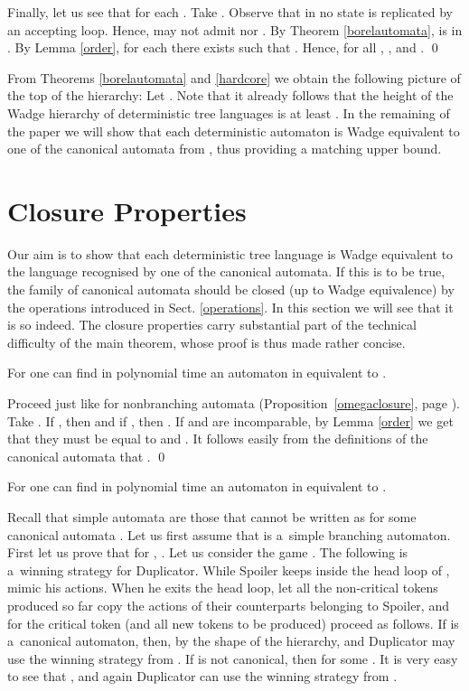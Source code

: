 \documentclass{LMCS}
\begin{document}
Finally, let us see that  for each . Take . Observe that in  no state is replicated by an accepting loop. Hence,  may not admit  nor . By Theorem \ref{borelautomata},   is in . By Lemma \ref{order}, for each  there exists  such that . Hence, for all , , and . \qed

\vspace{5pt}

From Theorems \ref{borelautomata} and \ref{hardcore} we obtain the
following picture of the top of the hierarchy:  Let . Note that it already follows
that the height of the Wadge hierarchy of deterministic tree languages
is at least
. In the remaining of the paper we will
show that each deterministic automaton is Wadge equivalent to one of
the canonical automata from , thus providing a matching
upper bound.

\section{Closure Properties} \label{closureproperties}

Our aim is to show that each deterministic tree language is Wadge equivalent to the language recognised by one of the canonical automata. If this is to be true, the family of canonical automata should be closed (up to Wadge equivalence) by the operations introduced in Sect. \ref{operations}. In this section we will see that it is so indeed. The closure properties carry substantial part of the technical difficulty of the main theorem, whose proof is thus made rather concise. 

\begin{prop}\label{lor_closure}
For  one can find in polynomial time an automaton in  equivalent to .
\end{prop}

\proof Proceed just like for nonbranching automata (Proposition~\ref{omegaclosure}, page \pageref{omegaclosure}). Take . If , then  and if  , then . If  and  are incomparable, by Lemma \ref{order} we get that they must be equal to  and . It follows easily from the definitions of the canonical automata that . \qed

\begin{prop}\label{oplus_closure}
For  one can find in polynomial time an automaton in  equivalent to .
\end{prop}

\proof Recall that simple automata are those that cannot be written as  for some canonical automata . Let us first assume that  is a~simple branching automaton.  First let us prove that for , . Let us consider the game . The following is a~winning strategy for Duplicator.  While Spoiler keeps inside the head loop of , mimic his actions. When he exits the head loop, let all the non-critical tokens produced so far copy the actions of their counterparts belonging to Spoiler, and for the critical token (and all new tokens to be produced) proceed as follows. If  is a~canonical automaton, then,  by the shape of the hierarchy,  and Duplicator may use the winning strategy from . If  is not canonical, then  for some . It is very easy to see that , and again Duplicator can use the winning strategy from .
\end{document}

